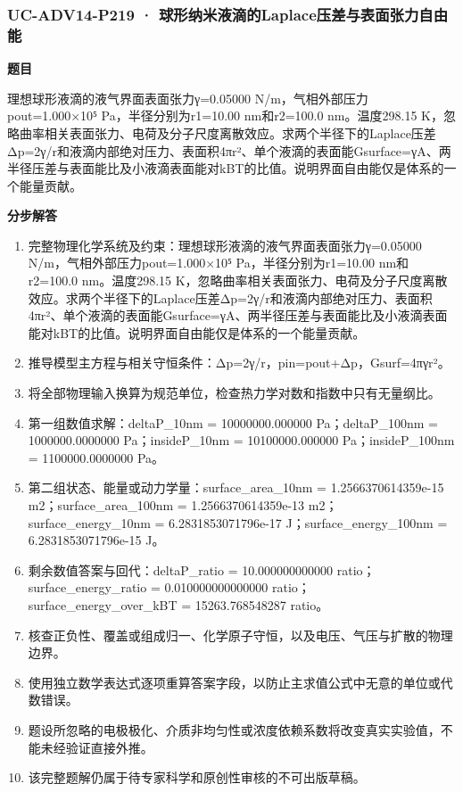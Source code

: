 \documentclass[UTF8,11pt,a4paper]{ctexart}
\begin{document}
\subsubsection*{UC-ADV14-P219 · 球形纳米液滴的Laplace压差与表面张力自由能}
\noindent\textbf{题目}\par
理想球形液滴的液气界面表面张力γ=0.05000 N/m，气相外部压力pout=1.000×10⁵ Pa，半径分别为r1=10.00 nm和r2=100.0 nm。温度298.15 K，忽略曲率相关表面张力、电荷及分子尺度离散效应。求两个半径下的Laplace压差Δp=2γ/r和液滴内部绝对压力、表面积4πr²、单个液滴的表面能Gsurface=γA、两半径压差与表面能比及小液滴表面能对kBT的比值。说明界面自由能仅是体系的一个能量贡献。\par
\medskip\noindent\textbf{分步解答}
\begin{enumerate}
\item 完整物理化学系统及约束：理想球形液滴的液气界面表面张力γ=0.05000 N/m，气相外部压力pout=1.000×10⁵ Pa，半径分别为r1=10.00 nm和r2=100.0 nm。温度298.15 K，忽略曲率相关表面张力、电荷及分子尺度离散效应。求两个半径下的Laplace压差Δp=2γ/r和液滴内部绝对压力、表面积4πr²、单个液滴的表面能Gsurface=γA、两半径压差与表面能比及小液滴表面能对kBT的比值。说明界面自由能仅是体系的一个能量贡献。
\item 推导模型主方程与相关守恒条件：Δp=2γ/r，pin=pout+Δp，Gsurf=4πγr²。
\item 将全部物理输入换算为规范单位，检查热力学对数和指数中只有无量纲比。
\item 第一组数值求解：deltaP\_10nm = 10000000.000000 Pa；deltaP\_100nm = 1000000.0000000 Pa；insideP\_10nm = 10100000.000000 Pa；insideP\_100nm = 1100000.0000000 Pa。
\item 第二组状态、能量或动力学量：surface\_area\_10nm = 1.2566370614359e-15 m2；surface\_area\_100nm = 1.2566370614359e-13 m2；surface\_energy\_10nm = 6.2831853071796e-17 J；surface\_energy\_100nm = 6.2831853071796e-15 J。
\item 剩余数值答案与回代：deltaP\_ratio = 10.000000000000 ratio；surface\_energy\_ratio = 0.010000000000000 ratio；surface\_energy\_over\_kBT = 15263.768548287 ratio。
\item 核查正负性、覆盖或组成归一、化学原子守恒，以及电压、气压与扩散的物理边界。
\item 使用独立数学表达式逐项重算答案字段，以防止主求值公式中无意的单位或代数错误。
\item 题设所忽略的电极极化、介质非均匀性或浓度依赖系数将改变真实实验值，不能未经验证直接外推。
\item 该完整题解仍属于待专家科学和原创性审核的不可出版草稿。
\end{enumerate}
\end{document}
